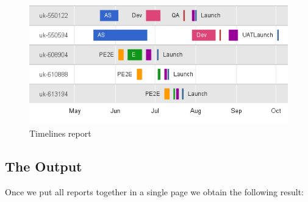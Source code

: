 \begin{figure}[ht!]
	\centering
   	\includegraphics[width=1\textwidth]{./resources/report_timelines_new.png}
   	\caption{Timelines report}
   	\label{f_report_timelines_new}
\end{figure}

\subsection{The Output}
Once we put all reports together in a single page we obtain the following
result:

